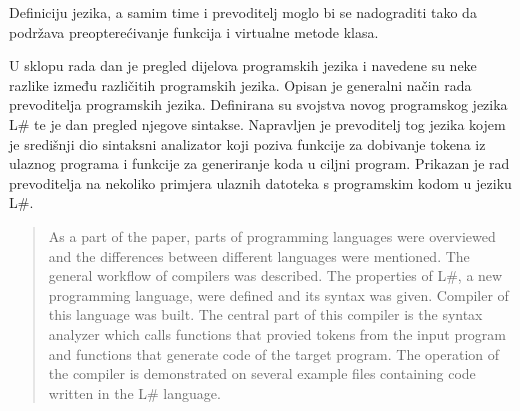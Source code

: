 \documentclass[times, utf8, zavrsni]{fer}
\begin{document}
Definiciju jezika, a samim time i prevoditelj moglo bi se nadograditi tako da podržava preopterećivanje funkcija i virtualne metode klasa.




\begin{sazetak}
    U sklopu rada dan je pregled dijelova programskih jezika i navedene su neke razlike između različitih programskih jezika.
    Opisan je generalni način rada prevoditelja programskih jezika. Definirana su svojstva novog programskog jezika L\# te je dan pregled njegove sintakse.
    Napravljen je prevoditelj tog jezika kojem je središnji dio sintaksni analizator koji poziva funkcije za dobivanje tokena iz ulaznog programa i
    funkcije za generiranje koda u ciljni program. Prikazan je rad prevoditelja na nekoliko primjera ulaznih datoteka s programskim kodom u jeziku L\#.
        
\end{sazetak}

\begin{abstract}
As a part of the paper, parts of programming languages were overviewed and the differences between different languages were mentioned.
The general workflow of compilers was described. The properties of L\#, a new programming language, were defined and its syntax was given.
Compiler of this language was built. The central part of this compiler is the syntax analyzer which calls functions that provied tokens from the input program and
functions that generate code of the target program. The operation of the compiler is demonstrated on several example files containing code written
in the L\# language.

\end{abstract}
\end{document}
